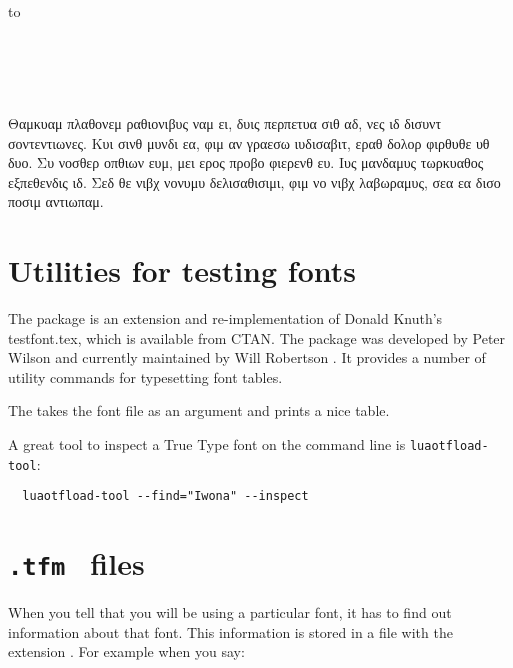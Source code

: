 \bgroup
{}
\begin{minipage}[t]{.2\linewidth}
\hbox to 
\end{minipage}
\begin{minipage}[t]{.65\linewidth}
^^A
\noindent\fox\\
\alphabet\\
\textsc{\alphabet}\\
\punctuation\\
\frogking
Θαμκυαμ πλαθονεμ ραθιονιβυς ναμ ει, δυις περπετυα σιθ αδ, νες ιδ δισυντ σοντεντιωνες. Κυι σινθ μυνδι εα, φιμ αν γραεσω ιυδισαβιτ, εραθ δολορ φιρθυθε υθ δυο. Συ νοσθερ οπθιων ευμ, μει ερος προβο φιερενθ ευ. Ιυς μανδαμυς τωρκυαθος εξπεθενδις ιδ. Σεδ θε νιβχ νονυμυ δελισαθισιμι, φιμ νο νιβχ λαβωραμυς, σεα εα δισο ποσιμ αντιωπαμ.
\end{minipage}
\egroup

\section{Utilities for testing fonts}

The package  is an extension and re-implementation of Donald Knuth’s testfont.tex, which
is available from CTAN. The package was developed by Peter Wilson and currently maintained by Will Robertson \citep{fonttable}. It provides a number of utility commands for typesetting font tables.

\begin{macro}{\fonttable}
The  takes the font file as an  argument and prints a nice table. 
\end{macro}
 
\ifxetex
 \else
\fi

A great tool to inspect a True Type font on the command line is \texttt{luaotfload-tool}:

\begin{verbatim}
  luaotfload-tool --find="Iwona" --inspect
\end{verbatim}

\section{ \texttt{.tfm } files}


When you tell \tex that you will be using a particular font, it has to find out information about that font. This information is stored in a file with the extension . For example when you say:

